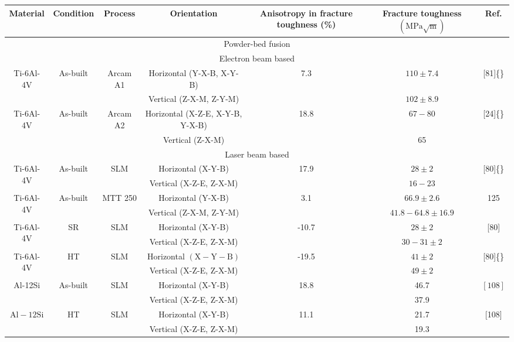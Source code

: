 \documentclass[10pt]{article}
\begin{document}
\begin{center}
\begin{tabular}{|c|c|c|c|c|c|c|}
\hline
Material & Condition & Process & Orientation & Anisotropy in fracture toughness (\%) & Fracture toughness $(\mathrm{MPa} \sqrt{\mathrm{m}})$ & Ref. \\
\hline
\multicolumn{7}{|c|}{Powder-bed fusion} \\
\hline
\multicolumn{7}{|c|}{Electron beam based} \\
\hline
\multirow[t]{2}{*}{Ti-6Al-4V} & \multirow[t]{2}{*}{As-built} & \multirow[t]{2}{*}{Arcam A1} & Horizontal (Y-X-B, X-Y-B) & \multirow[t]{2}{*}{7.3} & $110 \pm 7.4$ & \multirow[t]{2}{*}{[81]\{\}} \\
\hline
 &  &  & Vertical (Z-X-M, Z-Y-M) &  & $102 \pm 8.9$ &  \\
\hline
\multirow[t]{2}{*}{Ti-6Al-4V} & \multirow{2}{*}{As-built} & \multirow{2}{*}{Arcam A2} & Horizontal (X-Z-E, X-Y-B, Y-X-B) & \multirow[t]{2}{*}{18.8} & $67-80$ & \multirow[t]{2}{*}{[24]\{\}} \\
\hline
 &  &  & Vertical (Z-X-M) &  & 65 &  \\
\hline
\multicolumn{7}{|c|}{Laser beam based} \\
\hline
\multirow[t]{2}{*}{Ti-6Al-4V} & \multirow[t]{2}{*}{As-built} & \multirow[t]{2}{*}{SLM} & Horizontal (X-Y-B) & \multirow[t]{2}{*}{17.9} & $28 \pm 2$ & \multirow[t]{2}{*}{[80]\{\}} \\
\hline
 &  &  & Vertical (X-Z-E, Z-X-M) &  & $16-23$ &  \\
\hline
\multirow[t]{2}{*}{Ti-6Al-4V} & \multirow[t]{2}{*}{As-built} & \multirow[t]{2}{*}{MTT 250} & Horizontal (Y-X-B) & \multirow[t]{2}{*}{3.1} & $66.9 \pm 2.6$ & \multirow[t]{2}{*}{125} \\
\hline
 &  &  & Vertical (Z-X-M, Z-Y-M) &  & $41.8-64.8 \pm 16.9$ &  \\
\hline
\multirow{2}{*}{Ti-6Al-4V} & \multirow{2}{*}{SR} & \multirow{2}{*}{SLM} & Horizontal (X-Y-B) & \multirow{2}{*}{-10.7} & $28 \pm 2$ & \multirow[t]{2}{*}{[80]} \\
\hline
 &  &  & Vertical (X-Z-E, Z-X-M) &  & $30-31 \pm 2$ &  \\
\hline
\multirow[t]{2}{*}{Ti-6Al-4V} & \multirow[t]{2}{*}{HT} & \multirow[t]{2}{*}{SLM} & Horizontal $(\mathrm{X}-\mathrm{Y}-\mathrm{B})$ & \multirow[t]{2}{*}{-19.5} & $41 \pm 2$ & \multirow[t]{2}{*}{[80]\{\}} \\
\hline
 &  &  & Vertical (X-Z-E, Z-X-M) &  & $49 \pm 2$ &  \\
\hline
\multirow[t]{2}{*}{Al-12Si} & \multirow[t]{2}{*}{As-built} & \multirow[t]{2}{*}{SLM} & Horizontal (X-Y-B) & 18.8 & 46.7 & $[108]$ \\
\hline
 &  &  & Vertical (X-Z-E, Z-X-M) &  & 37.9 &  \\
\hline
$\mathrm{Al}-12 \mathrm{Si}$ & HT & SLM & Horizontal (X-Y-B) & 11.1 & 21.7 & [108] \\
\hline
 &  &  & Vertical (X-Z-E, Z-X-M) &  & 19.3 &  \\
\hline
\end{tabular}
\end{center}
\end{document}
